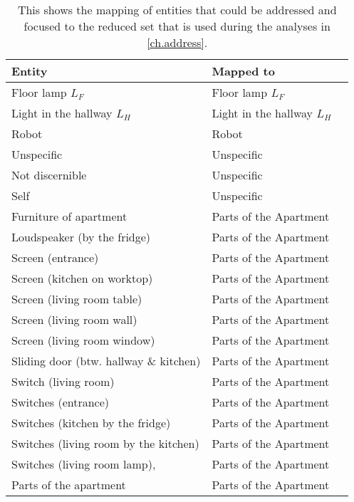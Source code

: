 \begin{table}[!ht]
    \centering
    \begin{tabulary}{\textwidth}{L L L}
        \toprule
        Entity                                     & Mapped to \\ \midrule
        Floor lamp \(L_F\)                         & Floor lamp \(L_F\) \\
        Light in the hallway \(L_H\)               & Light in the hallway \(L_H\)     \\
        Robot                                      & Robot      \\
        Unspecific                                 & Unspecific      \\
        Not discernible                            & Unspecific      \\
        Self                                       & Unspecific      \\
        Furniture of apartment                     & Parts of the Apartment  \\
        Loudspeaker (by the fridge)                & Parts of the Apartment  \\
        Screen (entrance)                          & Parts of the Apartment  \\
        Screen (kitchen on worktop)                & Parts of the Apartment  \\
        Screen (living room table)                 & Parts of the Apartment  \\
        Screen (living room wall)                  & Parts of the Apartment  \\
        Screen (living room window)                & Parts of the Apartment  \\
        Sliding door (btw. hallway \& kitchen)     & Parts of the Apartment  \\
        Switch (living room)                       & Parts of the Apartment  \\
        Switches (entrance)                        & Parts of the Apartment  \\
        Switches (kitchen by the fridge)           & Parts of the Apartment  \\
        Switches (living room by the kitchen)      & Parts of the Apartment  \\
        Switches (living room lamp),               & Parts of the Apartment  \\
        Parts of the apartment                     & Parts of the Apartment  \\
        \bottomrule
    \end{tabulary}
    \caption[Addressable entity mapping.]{\label{app:study-addressee-addressees-codes}
    This shows the mapping of entities that could be addressed and focused to the reduced set that is used during the analyses in \vref{ch.address}.
    }
\end{table}

